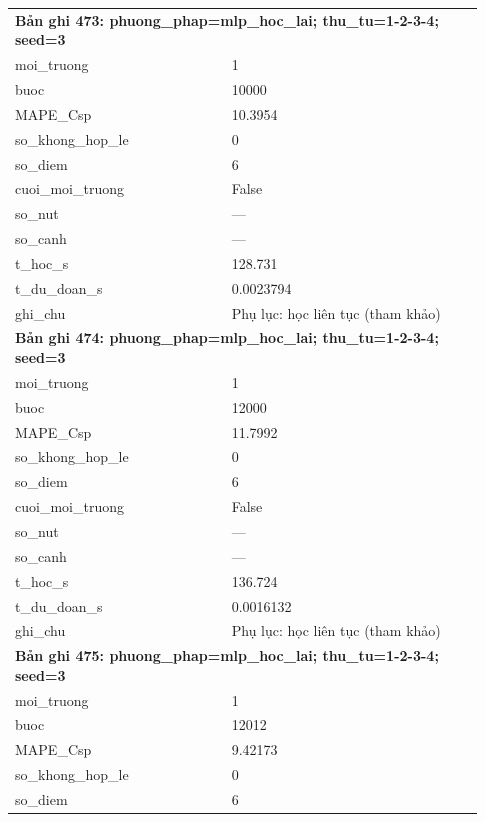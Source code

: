 \begin{longtable}{p{0.43\linewidth}p{0.50\linewidth}}
\midrule
\multicolumn{2}{p{0.95\linewidth}}{\textbf{Bản ghi 473: phuong\_phap=mlp\_hoc\_lai; thu\_tu=1-2-3-4; seed=3}} \\
moi\_\allowbreak truong & 1 \\
buoc & 10000 \\
MAPE\_\allowbreak Csp & 10.3954 \\
so\_\allowbreak khong\_\allowbreak hop\_\allowbreak le & 0 \\
so\_\allowbreak diem & 6 \\
cuoi\_\allowbreak moi\_\allowbreak truong & False \\
so\_\allowbreak nut & — \\
so\_\allowbreak canh & — \\
t\_\allowbreak hoc\_\allowbreak s & 128.731 \\
t\_\allowbreak du\_\allowbreak doan\_\allowbreak s & 0.0023794 \\
ghi\_\allowbreak chu & Phụ lục: học liên tục (tham khảo) \\
\midrule
\multicolumn{2}{p{0.95\linewidth}}{\textbf{Bản ghi 474: phuong\_phap=mlp\_hoc\_lai; thu\_tu=1-2-3-4; seed=3}} \\
moi\_\allowbreak truong & 1 \\
buoc & 12000 \\
MAPE\_\allowbreak Csp & 11.7992 \\
so\_\allowbreak khong\_\allowbreak hop\_\allowbreak le & 0 \\
so\_\allowbreak diem & 6 \\
cuoi\_\allowbreak moi\_\allowbreak truong & False \\
so\_\allowbreak nut & — \\
so\_\allowbreak canh & — \\
t\_\allowbreak hoc\_\allowbreak s & 136.724 \\
t\_\allowbreak du\_\allowbreak doan\_\allowbreak s & 0.0016132 \\
ghi\_\allowbreak chu & Phụ lục: học liên tục (tham khảo) \\
\midrule
\multicolumn{2}{p{0.95\linewidth}}{\textbf{Bản ghi 475: phuong\_phap=mlp\_hoc\_lai; thu\_tu=1-2-3-4; seed=3}} \\
moi\_\allowbreak truong & 1 \\
buoc & 12012 \\
MAPE\_\allowbreak Csp & 9.42173 \\
so\_\allowbreak khong\_\allowbreak hop\_\allowbreak le & 0 \\
so\_\allowbreak diem & 6 \\

\end{longtable}
